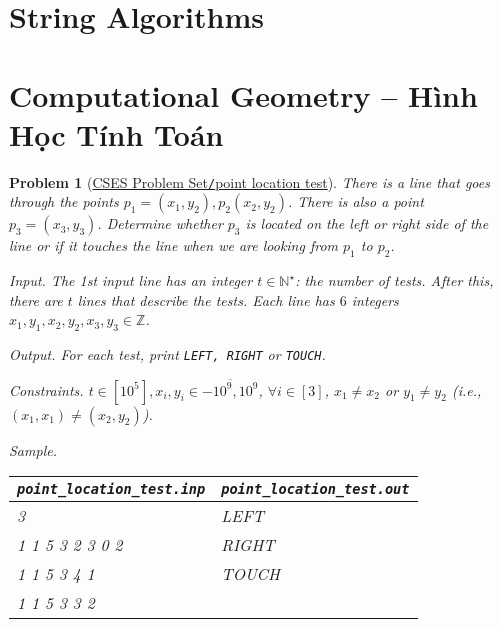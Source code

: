 \documentclass{article}
\newtheorem{problem}{Problem}
\begin{document}

\section{String Algorithms}


\section{Computational Geometry -- Hình Học Tính Toán}

\begin{problem}[\href{https://cses.fi/problemset/task/2189}{CSES Problem Set{\tt/}point location test}]
    There is a line that goes through the points $p_1 = (x_1,y_2),p_2(x_2,y_2)$. There is also a point $p_3 = (x_3,y_3)$. Determine whether $p_3$ is located on the left or right side of the line or if it touches the line when we are looking from $p_1$ to $p_2$.
    \item {\sf Input.} The 1st input line has an integer $t\in\mathbb{N}^\star$: the number of tests. After this, there are $t$ lines that describe the tests. Each line has $6$ integers $x_1,y_1,x_2,y_2,x_3,y_3\in\mathbb{Z}$.
    \item {\sf Output.} For each test, print {\tt LEFT, RIGHT} or {\tt TOUCH}.
    \item {\sf Constraints.} $t\in[10^5],x_i,y_i\in\overline{-10^9,10^9}$, $\forall i\in[3]$, $x_1\ne x_2$ or $y_1\ne y_2$ (i.e., $(x_1,x_1)\ne(x_2,y_2)$).
    \item {\sf Sample.}
    \begin{table}[H]
        \centering
        \begin{tabular}{|l|l|}
            \hline
            \verb|point_location_test.inp| & \verb|point_location_test.out| \\
            \hline
            3 & LEFT \\
            1 1 5 3 2 3 0 2 & RIGHT \\
            1 1 5 3 4 1 & TOUCH \\
            1 1 5 3 3 2 & \\
            \hline
        \end{tabular}
    \end{table}
\end{problem}
\end{document}
